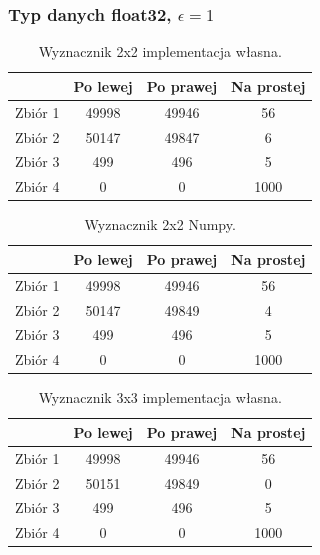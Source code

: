 \documentclass[11pt]{scrartcl}
\begin{document}
    \subsubsection{Typ danych float32, $\epsilon=1$}
    \begin{table}[H]
        \centering
        \renewcommand{\arraystretch}{1.5}
        \begin{tabular}{| c | c | c | c |}
            \hline
            & Po lewej & Po prawej & Na prostej \\
            \hline
            Zbiór 1 & 49998 & 49946 & 56 \\
            \hline
            Zbiór 2 & 50147 & 49847 & 6 \\
            \hline
            Zbiór 3 & 499 & 496 & 5 \\
            \hline
            Zbiór 4 & 0 & 0 & 1000 \\
            \hline
        \end{tabular}
        \renewcommand{\arraystretch}{1.5}
        \caption{Wyznacznik 2x2 implementacja własna.}
    \end{table}
    \begin{table}[H]
        \centering
        \renewcommand{\arraystretch}{1.5}
        \begin{tabular}{| c | c | c | c |}
            \hline
            & Po lewej & Po prawej & Na prostej \\
            \hline
            Zbiór 1 & 49998 & 49946 & 56 \\
            \hline
            Zbiór 2 & 50147 & 49849 & 4 \\
            \hline
            Zbiór 3 & 499 & 496 & 5 \\
            \hline
            Zbiór 4 & 0 & 0 & 1000 \\
            \hline
        \end{tabular}
        \renewcommand{\arraystretch}{1.5}
        \caption{Wyznacznik 2x2 Numpy.}
    \end{table}
    \begin{table}[H]
        \centering
        \renewcommand{\arraystretch}{1.5}
        \begin{tabular}{| c | c | c | c |}
            \hline
            & Po lewej & Po prawej & Na prostej \\
            \hline
            Zbiór 1 & 49998 & 49946 & 56 \\
            \hline
            Zbiór 2 & 50151 & 49849 & 0 \\
            \hline
            Zbiór 3 & 499 & 496 & 5 \\
            \hline
            Zbiór 4 & 0 & 0 & 1000 \\
            \hline
        \end{tabular}
        \renewcommand{\arraystretch}{1.5}
        \caption{Wyznacznik 3x3 implementacja własna.}
    \end{table}
\end{document}
